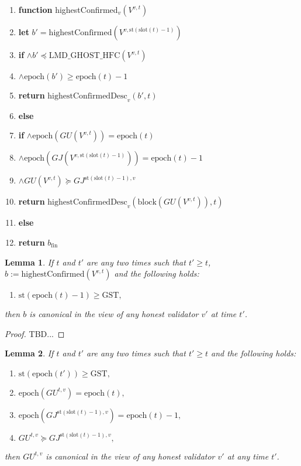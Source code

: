 \documentclass{article}
\newtheorem{lemma}{Lemma}
\begin{document}
\begin{enumerate}
    \item \textbf{function} highestConfirmed$_v(V^{v,t})$
    \item \quad \textbf{let} $b' = \text{highestConfirmed}(V^{v, \text{st}(\text{slot}(t) - 1)})$
    \item \quad \textbf{if} $\wedge b' \preceq \text{LMD\_GHOST\_HFC}(V^{v, t})$
    \item \quad \quad $\wedge \text{epoch}(b') \geq \text{epoch}(t) - 1$
    \item \quad \quad \quad \textbf{return} $\text{highestConfirmedDesc}_v(b', t)$
    \item \quad \textbf{else}
    \item \quad \quad \textbf{if} $\wedge \text{epoch}(GU(V^{v, t})) = \text{epoch}(t)$
    \item \quad \quad \quad $\wedge \text{epoch}(GJ(V^{v, \text{st}(\text{slot}(t) - 1)})) = \text{epoch}(t) - 1$
    \item \quad \quad \quad $\wedge GU(V^{v,t}) \succeq GJ^{\text{st}(\text{slot}(t) - 1), v}$
    \item \quad \quad \quad \quad \textbf{return} $\text{highestConfirmedDesc}_v(\text{block}(GU(V^{v,t})), t)$
    \item \quad \quad \textbf{else}
    \item \quad \quad \quad \textbf{return} $b_{\text{fin}}$
\end{enumerate}

\begin{lemma}
    If $t$ and $t'$ are any two times such that $t' \geq t$, $b := \text{highestConfirmed}(V^{v,t})$ and the following holds:
    
    \begin{enumerate}
        \item $\text{st}(\text{epoch}(t) - 1) \geq \text{GST},$
    \end{enumerate}
    
    then $b$ is canonical in the view of any honest validator $v'$ at time $t'$.
\end{lemma}

\begin{proof}
    TBD...
\end{proof}


\begin{lemma}
    If $t$ and $t'$ are any two times such that $t' \geq t$ and the following holds:
    
    \begin{enumerate}
        \item $\text{st}(\text{epoch}(t')) \geq \text{GST},$
        \item $\text{epoch}(GU^{t,v}) = \text{epoch}(t),$
        \item $\text{epoch}(GJ^{\text{st}(\text{slot}(t)-1),v}) = \text{epoch}(t) - 1,$
        \item $GU^{t,v} \succeq GJ^{\text{st}(\text{slot}(t)-1),v},$
    \end{enumerate}
    
then $GU^{t,v}$ is canonical in the view of any honest validator $v'$ at any time $t'$.
\end{lemma}
\end{document}
